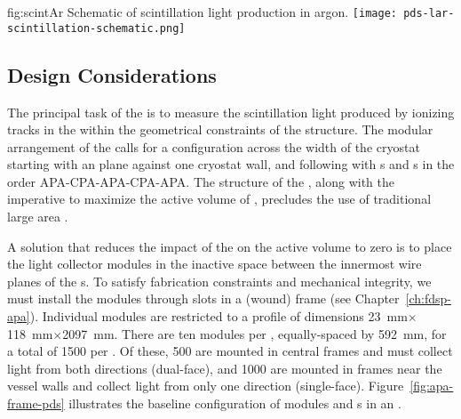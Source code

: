 \begin{dunefigure}{fig:scintAr}
{Schematic of scintillation light production in argon.}
\texttt{[image: pds-lar-scintillation-schematic.png]}
\end{dunefigure}

\subsection{Design Considerations}
\label{sec:fdsp-pd-des-consid}

The principal task of the   is to measure the  scintillation light produced by ionizing tracks in the  within the geometrical constraints of the  structure. The modular arrangement of the  calls for a configuration across the width of the cryostat starting with an  plane against one cryostat wall, and following with s and s in the order  APA-CPA-APA-CPA-APA.
The structure of the , along with the imperative to maximize the active volume of , precludes the use of traditional large area .  

A solution that reduces the impact of the  on the active volume to zero is to place the light collector modules in the inactive space between the innermost wire planes of the s. To satisfy  fabrication constraints and mechanical integrity, we must install the modules through slots in a (wound)  frame 
(see Chapter~\ref{ch:fdsp-apa}).  
Individual  modules are restricted to a profile of dimensions 
\SI{23}{mm}$\times$\SI{118}{mm}$\times$\SI{2097}{mm}.  There are ten  modules per , equally-spaced by \SI{592}{mm}, for a total of \num{1500} per .  Of these, \num{500} are mounted in central  frames and must collect light from both directions (dual-face), and \num{1000} are mounted in frames  near the vessel walls and collect light from only one direction (single-face).
Figure~\ref{fig:apa-frame-pds} illustrates the baseline configuration of  modules and s in an . 

